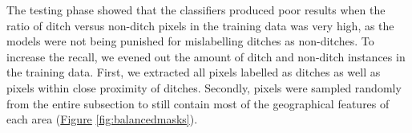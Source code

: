 \documentclass[]{interact}
\theoremstyle{plain}%
\theoremstyle{definition}
\theoremstyle{remark}
\begin{document}
The testing phase showed that the classifiers produced poor results when the ratio of ditch versus non-ditch pixels in the training data was very high, as the models were not being punished for mislabelling ditches as non-ditches. To increase the recall, we evened out the amount of ditch and non-ditch instances in the training data. First, we extracted all pixels labelled as ditches as well as pixels within close proximity of ditches. Secondly, pixels were sampled randomly from the entire subsection to still contain most of the geographical features of each area (\hyperref[fig:balancedmasks]{Figure} \ref{fig:balancedmasks}).

\begin{figure} [!htb]
    \centering
    \hspace{5pt}
    \subfigure[]{
}
\end{figure}
\end{document}
